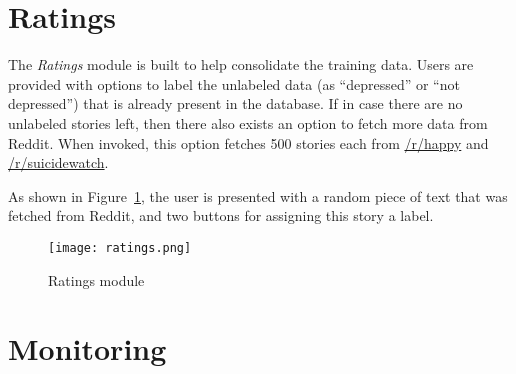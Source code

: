 \section{Ratings}
The \emph{Ratings} module is built to help consolidate the training data. Users are provided with options to label the unlabeled data (as ``depressed'' or ``not depressed'') that is already present in the database. If in case there are no unlabeled stories left, then there also exists an option to fetch more data from Reddit. When invoked, this option fetches 500 stories each from \href{http://www.reddit.com/r/happy}{/r/happy} and \href{http://www.reddit.com/r/suicidewatch}{/r/suicidewatch}.

As shown in Figure~\ref{ratings}, the user is presented with a random piece of text that was fetched from Reddit, and two buttons for assigning this story a label.

\begin{figure}
    \centering
    \texttt{[image: ratings.png]}
    \caption{Ratings module}
    \label{ratings}
\end{figure}

\section{Monitoring}
